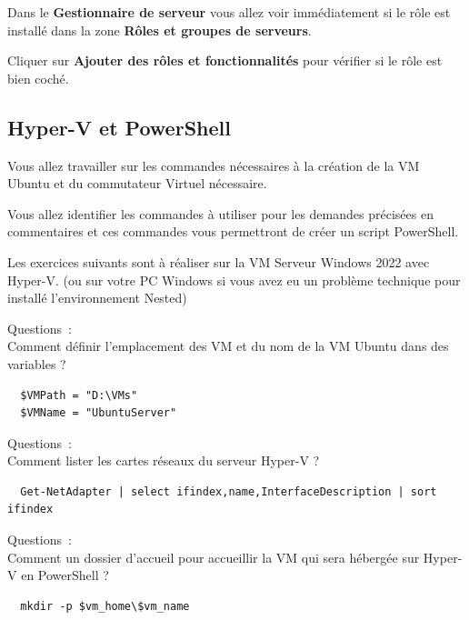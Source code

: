 \noindent Dans le \textbf{Gestionnaire de serveur} vous allez voir immédiatement si le rôle est installé dans la zone \textbf{Rôles et groupes de serveurs}.

\noindent Cliquer sur \textbf{Ajouter des rôles et fonctionnalités} pour vérifier si le rôle est bien coché.

\subsection*{Hyper-V et PowerShell}
{}

\noindent Vous allez travailler sur les commandes nécessaires à la création de la VM Ubuntu et du commutateur Virtuel nécessaire.

\noindent Vous allez identifier les commandes à utiliser pour les demandes précisées en commentaires et ces commandes vous permettront de créer un script PowerShell.

\noindent Les exercices suivants sont à réaliser sur la VM Serveur Windows 2022 avec Hyper-V. (ou sur votre PC Windows si vous avez eu un problème technique pour installé l'environnement Nested)

\vspace{1cm}

Questions~: \\
Comment définir l'emplacement des VM et du nom de la VM Ubuntu dans des variables ?

\begin{verbatim}
  $VMPath = "D:\VMs"
  $VMName = "UbuntuServer"
\end{verbatim}

\newpage

Questions~: \\
Comment lister les cartes réseaux du serveur Hyper-V ?

\begin{verbatim}
  Get-NetAdapter | select ifindex,name,InterfaceDescription | sort ifindex
\end{verbatim}

\vspace{0.5cm}

Questions~: \\
Comment un dossier d'accueil pour accueillir la VM qui sera hébergée sur Hyper-V en PowerShell ?

\begin{verbatim}
  mkdir -p $vm_home\$vm_name
\end{verbatim}

